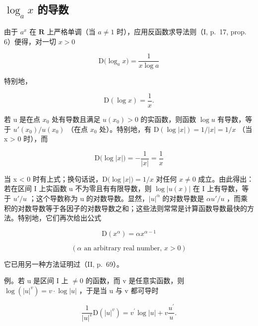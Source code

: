 \subsection{\texorpdfstring{\(\log_a x\) 的导数}{以 a 为底的 x 的对数之导数}}

由于 \(a^x\) 在 \(\mathbf{R}\) 上严格单调（当 \(a \neq 1\) 时），应用反函数求导法则（I, p.~17, prop. 6）便得，对一切 \(x > 0\)

\[
\mathrm{D} \big (\log_ {a} x \big) = \frac {1}{x \log a}\tag{9}
\]

特别地，

\[
\mathrm{D} (\log x) = \frac {1}{x}.\tag{10}
\]

若 u 是在点 \(x_{0}\) 处有导数且满足 \(u(x_{0}) > 0\) 的实函数，则函数 \(\log u\) 有导数，等于 \(u'(x_{0})/u(x_{0})\) （在点 \(x_{0}\) 处）。特别地，有 \(\mathrm{D}\left(\log |x|\right) = 1/|x| = 1/x\) （当 x \textgreater{} 0 时），而

\[
\mathrm{D} \big (\log | x | \big) = - \frac {1}{| x |} = \frac {1}{x}
\]

当 x \textless{} 0 时有上式；换句话说，\(\mathrm{D}\big(\log|x|\big) = 1/x\) 对任何 \(x \neq 0\) 成立。由此得出：若在区间 I 上实函数 u 不为零且有有限导数，则 \(\log|u(x)|\) 在 I 上有导数，等于 \(u'/u\) ；这个导数称为 u 的对数导数。显然，\(|u|^{\alpha}\) 的对数导数是 \(\alpha u'/u\) ，而乘积的对数导数等于各因子的对数导数之和；这些法则常常是计算函数导数最快的方法。特别地，它们再次给出公式

\[
\mathrm{D} \left(x ^ {\alpha}\right) = \alpha x ^ {\alpha - 1}
\]

\[
(\alpha \text {   an   arbitrary   real   number,   } x > 0)\tag{11}
\]

它已用另一种方法证明过（II, p.~69）。

例。若 u 是区间 I 上 \(\neq 0\) 的函数，而 v 是任意实函数，则 \(\log(|u|^{v}) = v \cdot \log |u|\) ，于是当 u 与 v 都可导时

\[
\frac {1}{| u | ^ {v}} \mathrm{D} (| u | ^ {v}) = v ^ {\prime} \log | u | + v \frac {u ^ {\prime}}{u}.
\]

